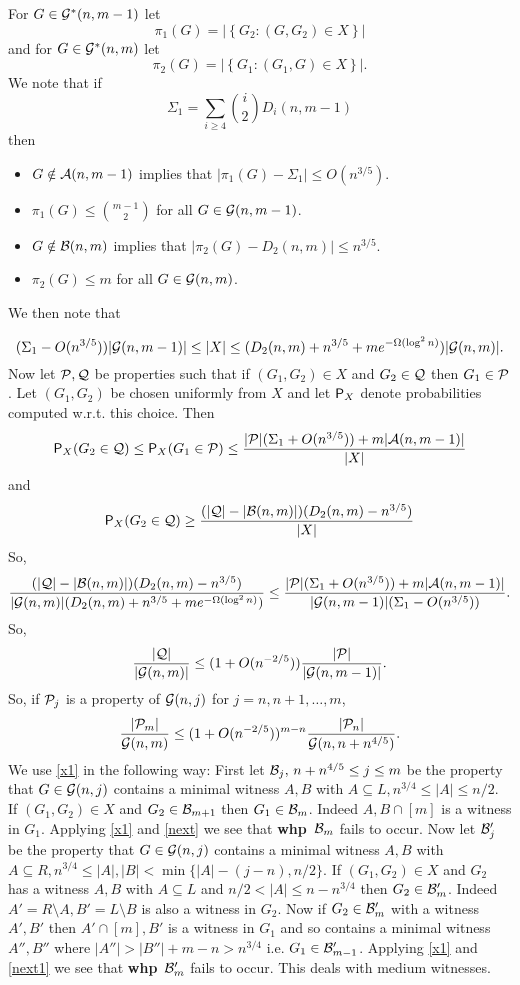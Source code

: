 \documentclass[11pt]{article}
\newcommand{\card}[1]{\left|#1\right|}
\def\cA{{\cal A}}
\def\cP{{\cal P}}
\def\p{\pi}
\def\S{\Sigma}
\def\whp{{\bf whp}}
\newcommand{\set}[1]{\left\{#1\right\}}
\def\Pr{{\sf P}}
\def\cB{{\cal B}}
\def\cG{{\cal G}}
\newcommand{\ignore}[1]{}
\def\cQ{{\cal Q}}
\newcommand{\beq}[1]{\begin{equation}\label{#1}}
\newcommand{\eeq}{\end{equation}}
\def\c{{3/4}}
\def\go{{3/5}}
\begin{document}
For $G\in \cG^*(n,m-1)$ let
$$\p_1(G)=|\set{G_2:(G,G_2)\in X}|$$
and for $G\in \cG^*(n,m)$ let
$$\p_2(G)=|\set{G_1:(G_1,G)\in X}|.$$
We note that if
$$\S_1=\sum_{i\geq 4}\binom{i}{2}D_i(n,m-1)$$ then
\begin{itemize}
 \item $G\notin \cA(n,m-1)$ implies that $\card{\p_1(G)-\S_1}\leq O(n^{\go})$.
\item $\p_1(G)\leq \binom{m-1}{2}$ for all $G\in \cG(n,m-1)$.
\item $G\notin \cB(n,m)$ implies that $\card{\p_2(G)-D_2(n,m)}\leq n^{\go}$.
\item $\p_2(G)\leq m$ for all $G\in \cG(n,m)$.
\end{itemize}
We then note that
\ignore{
\begin{align*}
\S_1-O(n^{\go})\leq &\frac{|X|}{|\cG(n,m)|}\leq \S_1+O(n^{\go})+m^2e^{-\Omega(\log^2n)}=\S_1+O(n^{\go}).\\
D_2(n,m+1)-n^{\go}\leq 
&\frac{|X|}{|\cG(n,m+1)|}\leq D_2(n,m+1)+n^{\go}+me^{-\Omega(\log^2n)}.
\end{align*}
}
$$ (\S_1-O(n^{\go}))|\cG(n,m-1)|\leq |X|\leq (D_2(n,m)+n^{\go}+me^{-\Omega(\log^2n)})|\cG(n,m)|.$$
Now let $\cP,\cQ$ be properties such that if $(G_1,G_2)\in X$ and $G_2\in\cQ$ then $G_1\in\cP$. Let $(G_1,G_2)$
be chosen uniformly from $X$ and let $\Pr_X$ denote probabilities computed w.r.t. this choice. Then
$$\Pr_X(G_2\in\cQ)\leq \Pr_X(G_1\in\cP)\leq \frac{|\cP|(\S_1+O(n^{\go}))+m|\cA(n,m-1)|}{|X|}$$
and
$$\Pr_X(G_2\in\cQ)\geq \frac{(|\cQ|-|\cB(n,m)|)(D_2(n,m)-n^{\go})}{|X|}$$
So,
$$\frac{(|\cQ|-|\cB(n,m)|)(D_2(n,m)-n^{\go})}
{|\cG(n,m)|(D_2(n,m)+n^{\go}+me^{-\Omega(\log^2n)})}
\leq \frac{|\cP|(\S_1+O(n^{\go}))+m|\cA(n,m-1)|}{|\cG(n,m-1)|(\S_1-O(n^{\go}))}.$$
So,
$$
\frac{|\cQ|}{|\cG(n,m)|}\leq (1+O(n^{-2/5}))\frac{|\cP|}{|\cG(n,m-1)|}.
$$
So, if $\cP_j$ is a property of $\cG(n,j)$ for $j=n,n+1,\ldots,m$, 
\beq{x1}
\frac{|\cP_m|}{\cG(n,m)}\leq (1+O(n^{-2/5}))^{m-n}\frac{|\cP_n|}{\cG(n,n+n^{4/5})}.
\eeq
We use \eqref{x1} in the following way: First let $\cB_{j},\,n+n^{4/5}\leq j\leq m$ be the property that $G\in \cG(n,j)$ 
contains a minimal witness $A,B$ with $A\subseteq L,
n^\c\leq |A|\leq n/2$.
If $(G_1,G_2)\in X$ and $G_2\in\cB_{m+1}$ then $G_1\in\cB_m$. 
Indeed $A,B\cap[m]$ is a witness in $G_1$.
Applying \eqref{x1} and \eqref{next} we see that 
\whp\ $\cB_m$ fails to occur. 
Now let $\cB'_j$ be the property that $G\in \cG(n,j)$ contains a minimal
witness $A,B$ with $A\subseteq R,n^\c\leq |A|,
|B|< \min\{|A|-(j-n),n/2\}$. 
If $(G_1,G_2)\in X$ and $G_2$ has a 
witness $A,B$ with $A\subseteq L$ and $n/2< |A|\leq n-n^\c$ 
then $G_2\in\cB'_m$. Indeed $A'=R\setminus A,B'=L\setminus B$ is 
also a witness in $G_2$. Now if $G_2\in\cB'_m$ with a witness
$A',B'$ then $A'\cap[m],B'$ is a witness in $G_1$ and so contains 
a minimal witness $A'',B''$ where 
$|A''|>|B''|+m-n>n^\c$ i.e. $G_1\in \cB_{m-1}'$.
Applying \eqref{x1} and \eqref{next1} we see that 
\whp\ $\cB_m'$ fails to occur. 
This deals with medium witnesses.
\end{document}
